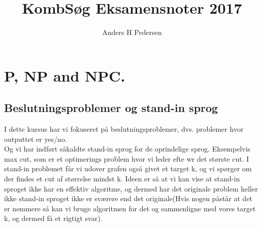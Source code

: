 \documentclass{article}
\title{KombSøg Eksamensnoter 2017}
\author{Anders H Pedersen }
\begin{document}
\maketitle
\tableofcontents

\newpage

\section{P, NP and NPC.}

\subsection{Beslutningsproblemer og stand-in sprog}
I dette kursus har vi fokuseret på beslutningsproblemer, dvs. problemer hvor outputtet er yes/no.\\ Og vi har indført såkaldte stand-in sprog for de oprindelige sprog. Eksempelvis max cut, som er et optimerings problem hvor vi leder efte wr det største cut. I stand-in problemet får vi udover grafen også givet et target k, og vi spørger om der findes et cut af størrelse mindst k. Ideen er så at vi kan vise at stand-in sproget ikke har en effektiv algoritme, og dermed har det originale problem heller ikke stand-in sproget ikke er sværere end det originale(Hvis nogen påstår at det er nemmere så kan vi bruge algoritmen for det og sammenligne med vores target k, og dermed få et rigtigt svar).
\end{document}
